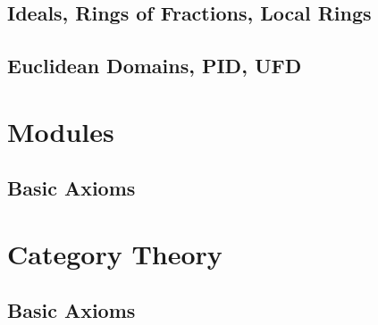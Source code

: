\documentclass[a4paper,sfsidenotes,openany]{tufte-book}
\theoremstyle{theorem}
\begin{document}
\begin{fullwidth}
\section{Ideals, Rings of Fractions, Local Rings}

\section{Euclidean Domains, PID, UFD}

\end{fullwidth}

\newpage

\chapter{Modules}
\begin{fullwidth}
\section{Basic Axioms}

\end{fullwidth}

\newpage

\chapter{Category Theory}
\begin{fullwidth}
\section{Basic Axioms}

\end{fullwidth}

\newpage

\printindex
\end{document}
